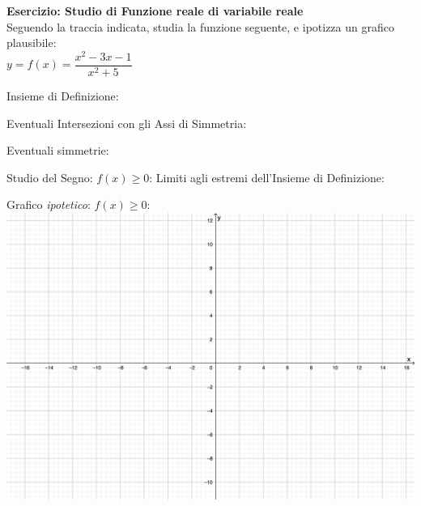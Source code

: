 \documentclass[12pt, a4paper, landscape]{exam}
\newcommand{\class}{\LARGE {Esercizio: Studio di Funzione reale di variabile reale}}
\begin{document}

{\huge{\bf \class}}\\

{\Large{Seguendo la traccia indicata, studia la funzione seguente, e ipotizza un grafico plausibile}}:\\

{\large {\(y = f(x) = \dfrac {x^2 - 3x - 1}{x^2 + 5}\)}}\\


\begin{questions}

\begin{multicols}{2}
\question
Insieme di Definizione:
\fillwithdottedlines{0.5in}
\vspace{0.3cm}

\question
Eventuali Intersezioni con gli Assi di Simmetria:

\fillwithdottedlines{0.5in}
\vspace{0.2cm}

\question Eventuali simmetrie:
\fillwithdottedlines{0.5in}
\vspace{0.2cm}

\question Studio del Segno: \(f(x) \ge 0\):
\fillwithdottedlines{0.5in}
\vspace{0.2cm}
\question Limiti agli estremi dell'Insieme di Definizione:

\fillwithdottedlines{0.5in}
\vspace{0.2cm}

\question Grafico {\em ipotetico}: \(f(x) \ge 0\):\\

\includegraphics[width=\columnwidth, fbox]{grafico_empty.png}

%

\end{multicols}
\end{questions}
\end{document}
